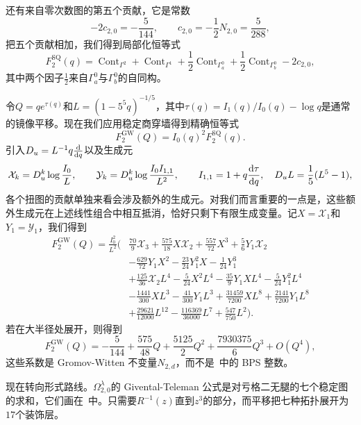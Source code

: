 \documentclass{amsart}
\theoremstyle{definition}
\theoremstyle{remark}
\theoremstyle{plain}
\theoremstyle{definition}
\theoremstyle{remark}
\newcommand{\mc}[1]{\mathcal{#1}}
\newcommand{\mr}[1]{\mathrm{#1}}
\newcommand{\1}{\mathbf{1}}
\newcommand{\2}{\mathbf{2}}
\newcommand{\3}{\mathbf{3}}
\DeclareMathOperator{\Cont}{Cont}
\begin{document}
还有来自零次数图的第五个贡献，它是常数
\[ -2c_{2,0} = -\frac{5}{144}, \qquad c_{2,0} = -\frac{1}{2}N_{2,0} = \frac{5}{288}, \]
把五个贡献相加，我们得到局部化恒等式
\[ F_2^{\mr{SQ}}(q) = \Cont_{\Gamma^2} + \Cont_{\Gamma^1} + \frac{1}{2}\Cont_{\Gamma_a^0} + \frac{1}{2}\Cont_{\Gamma_b^0} - 2c_{2,0}, \]
其中两个因子\(\frac{1}{2}\)来自\(\Gamma_a^0\)与\(\Gamma_b^0\)的自同构。

令\(Q = qe^{\tau(q)}\)和\(L = (1-5^5q)^{-1/5}\)，其中\(\tau(q) = I_1(q)/I_0(q) - \log q\)是通常的镜像平移。现在我们应用稳定商穿墙得到精确恒等式
\[ F_2^{\mr{GW}}(Q) = I_0(q)^2 F_2^{\mr{SQ}}(q). \]
引入\(D_u = L^{-1}q\odv{}{q}\)以及生成元
\[ \mc{X}_k = D_u^k \log \frac{I_0}{L}, \qquad \mc{Y}_k = D_u^k \log \frac{I_0I_{1,1}}{L^2}, \qquad I_{1,1} = 1 + q \odv{\tau}{q}, \quad D_u L = \frac{1}{5}(L^5-1), \]
各个扭图的贡献单独来看会涉及额外的生成元。对我们而言重要的一点是，这些额外生成元在上述线性组合中相互抵消，恰好只剩下有限生成变量。记\(X = \mc{X}_1\)和\(Y_1 = \mc{Y}_1\)，我们得到
\begin{align*}
    F^{\mr{GW}}_2(Q) = \frac{I_0^2}{L^2}\Big(&\frac{70}{9}\mc{X}_3 + \frac{575}{18}X\mc{X}_2 + \frac{557}{72}X^3 + \frac{5}{6}Y_1\mc{X}_2 \\
    &- \frac{629}{72}Y_1X^2 - \frac{23}{24}Y_1^2 X - \frac{1}{24}Y_1^3 \\
    &+ \frac{125}{36}\mc{X}_2 L^4 - \frac{5}{24}X^2L^4 - \frac{35}{9}Y_1XL^4 - \frac{5}{24}Y_1^2L^4 \\
    &- \frac{1441}{300}XL^3 - \frac{41}{300}Y_1L^3 + \frac{31459}{7200}XL^8 + \frac{2141}{7200}Y_1L^8 \\
    &+ \frac{29621}{12000}L^{12} - \frac{116369}{36000}L^7 + \frac{547}{750}L^2\Big).
\end{align*}
若在大半径处展开，则得到
\[ F_2^{\mr{GW}}(Q) = -\frac{5}{144} + \frac{575}{48}Q + \frac{5125}{2}Q^2 + \frac{7930375}{6}Q^3 + O(Q^4), \]
这些系数是 Gromov-Witten 不变量\(N_{2,d}\)，而不是~中的 BPS 整数。

现在转向形式路线。\(\Omega^{\lambda}_{2,0}\)的 Givental-Teleman 公式是对亏格二无腿的七个稳定图的求和，它们画在~中。只需要\(R^{-1}(z)\)直到\(z^3\)的部分，而平移把七种拓扑展开为\(17\)个装饰层。
\end{document}
